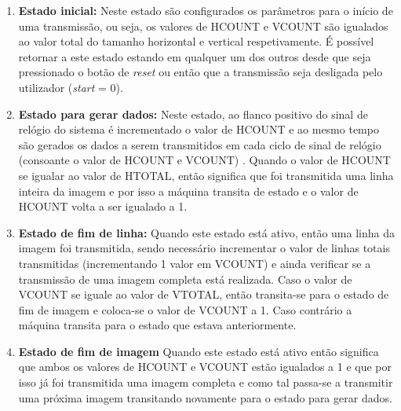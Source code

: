 \begin{enumerate}
	\item \textbf{Estado inicial:} Neste estado são configurados os parâmetros para o início de uma transmissão, ou seja, os valores de HCOUNT e VCOUNT são igualados ao valor total do tamanho horizontal e vertical respetivamente. É possível retornar a este estado estando em qualquer um dos outros desde que seja pressionado o botão  de \textit{reset} ou então que a transmissão seja desligada pelo utilizador (\textit{start} = 0).
	
	\item \textbf{Estado para gerar dados:} Neste estado, ao flanco positivo do sinal de relógio do sistema é incrementado o valor de HCOUNT e ao mesmo tempo são gerados os dados a serem transmitidos em cada ciclo de sinal de relógio (consoante o valor de HCOUNT e VCOUNT) . Quando o valor de HCOUNT se igualar ao valor de HTOTAL, então significa que foi transmitida uma linha inteira da imagem e por isso a máquina transita de estado e o valor de HCOUNT volta a ser igualado a 1.
	
	\item \textbf{Estado de fim de linha:} Quando este estado está ativo, então uma linha da imagem foi transmitida, sendo necessário incrementar o valor de linhas totais transmitidas (incrementando 1 valor em VCOUNT) e ainda verificar se a transmissão de uma imagem completa está realizada. Caso o valor de VCOUNT se iguale ao valor de VTOTAL, então transita-se para o estado de fim de imagem e coloca-se o valor de VCOUNT a 1. Caso contrário a máquina transita para o estado que estava anteriormente.
	
	\item \textbf{Estado de fim de imagem} Quando este estado está ativo então significa que ambos os valores de HCOUNT e VCOUNT estão igualados a 1 e que por isso já foi transmitida uma imagem completa e como tal passa-se a transmitir uma próxima imagem transitando novamente para o estado para gerar dados.
	
\end{enumerate}

